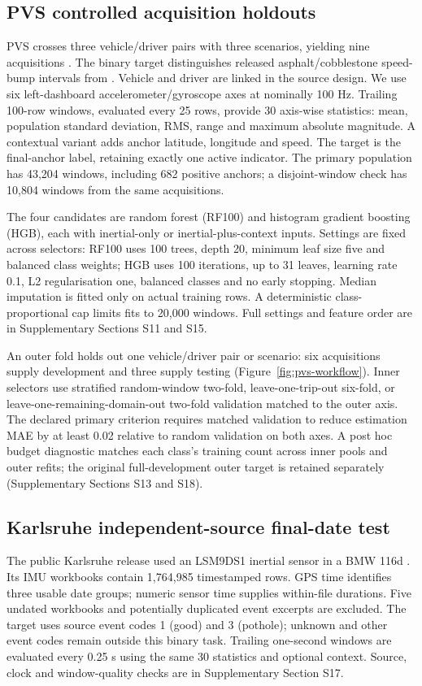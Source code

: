 \subsection{PVS controlled acquisition holdouts}
PVS crosses three vehicle/driver pairs with three scenarios, yielding nine acquisitions \citep{pvsdata,pvspaper}. The binary target distinguishes released asphalt/cobblestone speed-bump intervals from . Vehicle and driver are linked in the source design. We use six left-dashboard accelerometer/gyroscope axes at nominally 100 Hz. Trailing 100-row windows, evaluated every 25 rows, provide 30 axis-wise statistics: mean, population standard deviation, RMS, range and maximum absolute magnitude. A contextual variant adds anchor latitude, longitude and speed. The target is the final-anchor label, retaining exactly one active indicator. The primary population has 43,204 windows, including 682 positive anchors; a disjoint-window check has 10,804 windows from the same acquisitions.

The four candidates are random forest (RF100) and histogram gradient boosting (HGB), each with inertial-only or inertial-plus-context inputs. Settings are fixed across selectors: RF100 uses 100 trees, depth 20, minimum leaf size five and balanced class weights; HGB uses 100 iterations, up to 31 leaves, learning rate 0.1, L2 regularisation one, balanced classes and no early stopping. Median imputation is fitted only on actual training rows. A deterministic class-proportional cap limits fits to 20,000 windows. Full settings and feature order are in Supplementary Sections S11 and S15.

An outer fold holds out one vehicle/driver pair or scenario: six acquisitions supply development and three supply testing (Figure~\ref{fig:pvs-workflow}). Inner selectors use stratified random-window two-fold, leave-one-trip-out six-fold, or leave-one-remaining-domain-out two-fold validation matched to the outer axis. The declared primary criterion requires matched validation to reduce estimation MAE by at least 0.02 relative to random validation on both axes. A post hoc budget diagnostic matches each class's training count across inner pools and outer refits; the original full-development outer target is retained separately (Supplementary Sections S13 and S18).

\subsection{Karlsruhe independent-source final-date test}
The public Karlsruhe release used an LSM9DS1 inertial sensor in a BMW 116d \citep{kitpaper,kitdata}. Its IMU workbooks contain 1,764,985 timestamped rows. GPS time identifies three usable date groups; numeric sensor time supplies within-file durations. Five undated workbooks and potentially duplicated event excerpts are excluded. The target uses source event codes 1 (good) and 3 (pothole); unknown and other event codes remain outside this binary task. Trailing one-second windows are evaluated every 0.25 s using the same 30 statistics and optional context. Source, clock and window-quality checks are in Supplementary Section S17.

